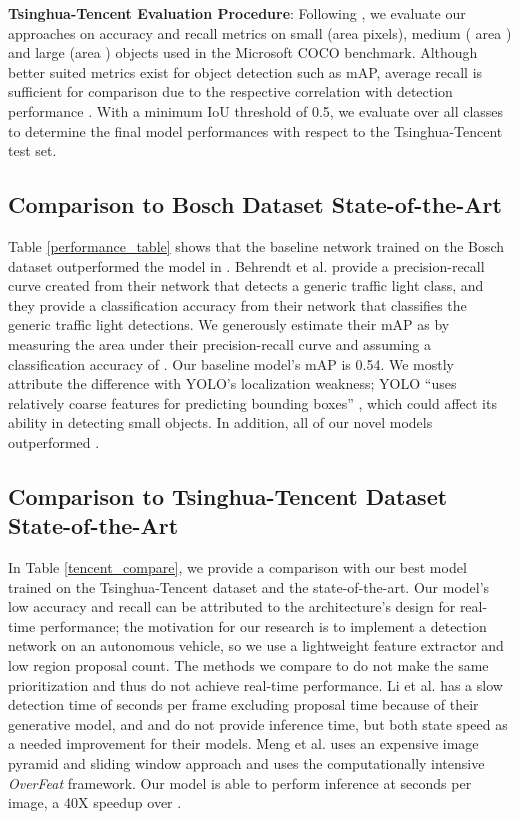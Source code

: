 \documentclass[10pt, conference, compsocconf]{IEEEtran}
\begin{document}
\noindent\textbf{Tsinghua-Tencent Evaluation Procedure}: Following \cite{tencent}, we evaluate our approaches on accuracy and recall metrics on small (area   pixels), medium (  area  ) and large (area  ) objects used in the Microsoft COCO benchmark. Although better suited metrics exist for object detection such as mAP, average recall is sufficient for comparison due to the respective correlation with detection performance \cite{effective_detections}. With a minimum IoU threshold of  0.5, we evaluate over all classes to determine the final model performances with respect to the Tsinghua-Tencent test set. \\

\subsection{Comparison to Bosch Dataset State-of-the-Art}

Table \ref{performance_table} shows that the baseline network trained on the Bosch dataset outperformed the model in \cite{behrendt2017}. Behrendt et al. \cite{behrendt2017} provide a precision-recall curve created from their network that detects a generic traffic light class, and they provide a classification accuracy from their network that classifies the generic traffic light detections. We generously estimate their mAP as  by measuring the area under their precision-recall curve and assuming a classification accuracy of .  Our baseline model's mAP is 0.54. We mostly attribute the difference with YOLO's localization weakness; YOLO ``uses relatively coarse features for predicting bounding boxes'' \cite{redmon2015}, which could affect its ability in detecting small objects. In addition, all of our novel models outperformed \cite{behrendt2017}.

\subsection{Comparison to Tsinghua-Tencent Dataset State-of-the-Art}

In Table \ref{tencent_compare}, we provide a comparison with our best model trained on the Tsinghua-Tencent dataset and the state-of-the-art. Our model's low accuracy and recall can be attributed to the architecture's design for real-time performance; the motivation for our research is to implement a detection network on an autonomous vehicle, so we use a lightweight feature extractor and low region proposal count. The methods we compare to do not make the same prioritization and thus do not achieve real-time performance. Li et al. \cite{perceptual_gan} has a slow detection time of  seconds per frame excluding proposal time because of their generative model, and \cite{meng} and \cite{tencent} do not provide inference time, but both state speed as a needed improvement for their models. Meng et al. \cite{meng} uses an expensive image pyramid and sliding window approach and \cite{tencent} uses the computationally intensive \textit{OverFeat} \cite{overfeat} framework.  Our model is able to perform inference at  seconds per image, a 40X speedup over \cite{perceptual_gan}.
\end{document}
